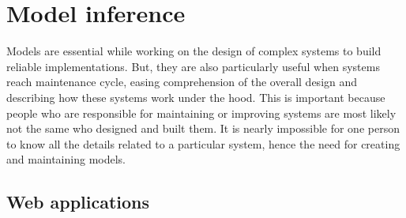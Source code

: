 %
\chapter{Model inference}
\label{sec:modelinf}

Models are essential while working on the design of complex systems to build
reliable implementations. But, they are also particularly useful when systems
reach maintenance cycle, easing comprehension of the overall design and
describing how these systems work under the hood. This is important because
people who are responsible for maintaining or improving systems are most likely
not the same who designed and built them. It is nearly impossible for one
person to know all the details related to a particular system, hence the need
for creating and maintaining models.

\section{Web applications}
\label{sec:modelinf}


